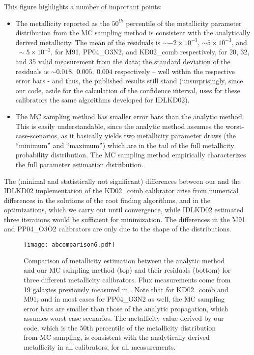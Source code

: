 \documentclass{emulateapj}
\begin{document}
This figure highlights a number of important points:
\begin{itemize}

\item
The metallicity reported as the $50^{th}$ percentile of the
metallicity parameter distribution from the MC sampling method is
consistent with the analytically derived metallicity. The mean of the
residuals is $\sim-2\times10^{-3}$, $\sim5\times10^{-3}$, and
$~\sim5\times10^{-2}$, for M91, PP04\_O3N2, and KD02\_comb
respectively, for 20, 32, and 35 valid measurement from the
\citet{modjaz11} data; the standard deviation of the residuals is
$\sim0.018,~ 0.005,~ 0.004$ respectively -- well within the respective
error bars - and thus, the published results still stand
(unsurprisingly, since our code, aside for the calculation of the
confidence interval, uses for these calibrators the same algorithms
developed for IDLKD02).
\item
The MC sampling method has smaller error bars than the analytic
method. This is easily understandable, since the analytic method
assumes the worst-case-scenarios, as it basically yields two
metallicity parameter draws (the ``minimum'' and ``maximum'') which
are in the tail of the full metallicity probability distribution. The
MC sampling method empirically characterizes the full parameter
estimation distribution.
\end{itemize}

The (minimal and statistically not significant) differences between
our and the IDLKD02 implementation of the KD02\_comb calibrator arise
from numerical differences in the solutions of the root finding
algorithms, and in the optimizations, which we carry out until
convergence, while IDLKD02 estimated three iterations would be
sufficient for minimization. The differences in the M91 and PP04\_O3O2
calibrators are only due to the shape of the distributions.

\begin{figure}[ht!]
  \texttt{[image: abcomparison6.pdf]}
   \caption{Comparison of metallicity estimation between the analytic
     method and our MC sampling method (top) and their residuals
     (bottom) for three different metallicity calibrators. Flux
     measurements come from 19 galaxies previously measured in
     \citet{modjaz11}.  Note that for KD02\_comb and M91, and in most
     cases for PP04\_O3N2 as well, the MC sampling error bars are
     smaller than those of the analytic propagation, which assumes
     worst-case scenarios. The metallicity value derived by our code,
     which is the 50th percentile of the metallicity distribution from
     MC sampling, is consistent with the analytically derived
     metallicity in all calibrators, for all measurements.}
 \label{fig:comp_anal_MC}
\end{figure}
\end{document}
